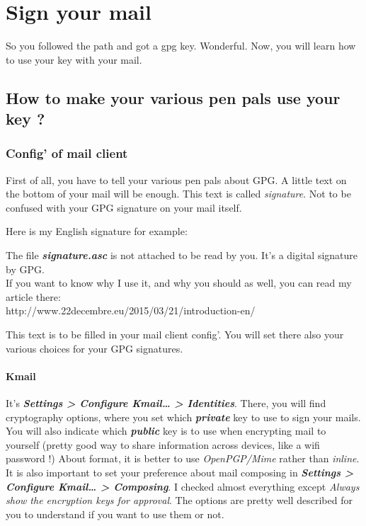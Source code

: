 \chapter{Sign your mail}

So you followed the path and got a gpg key. Wonderful. Now, you will learn how to use your key with your mail.

\section{How to make your various pen pals use your key ?}\label{how-to-make-your-various-pen-pals-use-your-key}

\subsection{Config' of mail client}\label{config-of-mail-client}

First of all, you have to tell your various pen pals about GPG. A little text on the
bottom of your mail will be enough. This text is called
\emph{signature}. Not to be confused with your GPG signature on your
mail itself.

Here is my English signature for example:

\begin{quoting}
The file \textbf{\emph{signature.asc}} is not attached to be read by
you. It's a digital signature by GPG.\\If you want to know why I use it,
and why you should as well, you can read my article
there:\\http://www.22decembre.eu/2015/03/21/introduction-en/
\end{quoting}

This text is to be filled in your mail client config'. You will set
there also your various choices for your GPG signatures.

\subsubsection{Kmail}\label{kmail}
It's \textbf{\emph{Settings \textgreater{} Configure
Kmail\ldots{} \textgreater{} Identities}}. There, you will find cryptography options, where you set which
\textbf{\emph{private}} key to use to sign your mails. You will also indicate which \textbf{\emph{public}} key is to use when
encrypting mail to yourself (pretty good way to share information across
devices, like a wifi password !) About format, it is better to use
\emph{OpenPGP/Mime} rather than \emph{inline}. It is also important to set your preference about mail composing in
\textbf{\emph{Settings \textgreater{} Configure Kmail\ldots{}
\textgreater{} Composing}}. I checked almost everything except \emph{Always show the encryption keys
for approval}. The options are pretty well described for you to
understand if you want to use them or not.

